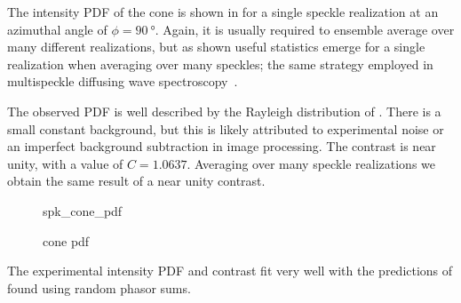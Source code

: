 The intensity PDF of the cone is shown in  for a single
speckle realization at an azimuthal angle of $\phi=\SI{90}{\degree}$.
Again, it is usually required to ensemble average over many different
realizations, but as shown useful statistics emerge for a single
realization when averaging over many speckles; the same strategy employed
in multispeckle diffusing wave spectroscopy~\cite{zakharov2006multispeckle}.

The observed PDF is well described by the Rayleigh distribution of
.  There is a small constant background, but this is
likely attributed to experimental noise or an imperfect background
subtraction in image processing.  The contrast is near unity, with a value
of $C=1.0637$.  Averaging over many speckle realizations we obtain the same
result of a near unity contrast.  
\begin{figure}[ht]
\centering
{spk_cone_pdf}
\caption{cone pdf}
\label{fig:conepdf}
\end{figure}

The experimental intensity PDF and contrast fit very well with the
predictions of found using random phasor sums.  
